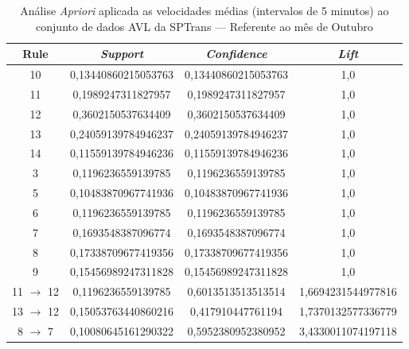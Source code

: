 \documentclass[
	12pt,				%
	oneside,			%
	a4paper,			%
	english,			%
	brazil				%
	]{abntex2ppgsi}
\begin{document}
{{\begin{apendicesenv}
\begin{table}[!htb]
\centering
\caption {Análise \textit{Apriori} aplicada as velocidades médias (intervalos de 5 minutos) ao conjunto de dados AVL da SPTrans --- Referente ao mês de Outubro}
\label {tab:aprioriOctober}
\begin{tabular}{c|c|c|c}
\hline
\textbf{Rule} & \textit{\textbf{Support}} & \textit{\textbf{Confidence}} & \textit{\textbf{Lift}} \\
\hline
10 &  0,13440860215053763 &  0,13440860215053763 &  1,0\\
\hline
11 &  0,1989247311827957 &  0,1989247311827957 &  1,0\\
\hline
12 &  0,3602150537634409 &  0,3602150537634409 &  1,0\\
\hline
13 &  0,24059139784946237 &  0,24059139784946237 &  1,0\\
\hline
14 &  0,11559139784946236 &  0,11559139784946236 &  1,0\\
\hline
3 &  0,1196236559139785 &  0,1196236559139785 &  1,0\\
\hline
5 &  0,10483870967741936 &  0,10483870967741936 &  1,0\\
\hline
6 &  0,1196236559139785 &  0,1196236559139785 &  1,0\\
\hline
7 &  0,1693548387096774 &  0,1693548387096774 &  1,0\\
\hline
8 &  0,17338709677419356 &  0,17338709677419356 &  1,0\\
\hline
9 &  0,15456989247311828 &  0,15456989247311828 &  1,0\\
\hline
11 $\rightarrow$ 12 &  0,1196236559139785 &  0,6013513513513514 &  1,6694231544977816\\
\hline
13 $\rightarrow$ 12 &  0,15053763440860216 &  0,417910447761194 &  1,7370132577336779\\
\hline
8 $\rightarrow$ 7 &  0,10080645161290322 &  0,5952380952380952 &  3,4330011074197118\\
\hline
\end{tabular}
\end{table}



\end{apendicesenv}}}
\end{document}
